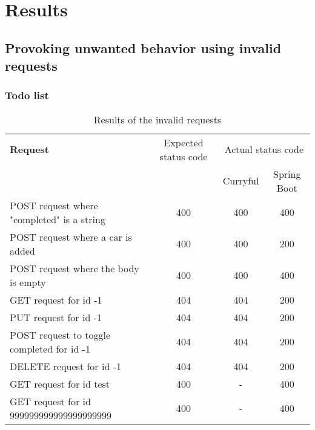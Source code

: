 \documentclass[a4paper]{article}
\begin{document}
\section{Results}
\subsection{Provoking unwanted behavior using invalid requests}
\subsubsection{Todo list}
\begin{table}[h!]
	\begin{tabularx}{\textwidth}{|X|c|c|c|}
		\hline
		\textbf{Request}                           & Expected status code & \multicolumn{2}{c|}{Actual status code}               \\
		                                           &                      & Curryful                                & Spring Boot \\
		\hline
		POST request where "completed" is a string & 400                  & 400                                     & 400         \\
		POST request where a car is added          & 400                  & 400                                     & 200         \\
		POST request where the body is empty       & 400                  & 400                                     & 400         \\
		GET request for id -1                      & 404                  & 404                                     & 200         \\
		PUT request for id -1                      & 404                  & 404                                     & 200         \\
		POST request to toggle completed for id -1 & 404                  & 404                                     & 200         \\
		DELETE request for id -1                   & 404                  & 404                                     & 200         \\
		GET request for id test                    & 400                  & -                                       & 400         \\
		GET request for id 999999999999999999999   & 400                  & -                                       & 400         \\
		\hline
	\end{tabularx}
	\caption{Results of the invalid requests}
\end{table}
\end{document}
